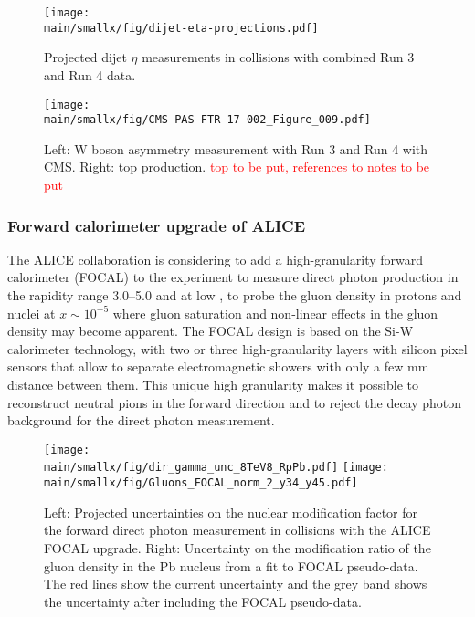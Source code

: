 \documentclass[../report.tex]{subfiles}
\providecommand{\main}{..}
\begin{document}
\begin{figure} %
\centering
\texttt{[image: \\main/smallx/fig/dijet-eta-projections.pdf]}
\caption{
Projected dijet $\eta$ measurements in \pPb collisions with combined Run 3 and Run 4 data.
\label{fig:dijet-eta-projection-cms}
}
\end{figure}

\begin{figure}
    \texttt{[image: \\main/smallx/fig/CMS-PAS-FTR-17-002\_Figure\_009.pdf]}
    \caption{Left: W boson asymmetry measurement with Run 3 and Run 4 with CMS. Right: top production. \textcolor{red}{top to be put, references to notes to be put}
    \label{fig:CMShighpt}
    }
\end{figure}

\clearpage
\newpage

\subsubsection{Forward calorimeter upgrade of ALICE}
\label{sec:Focal}
The ALICE collaboration is considering to add a high-granularity forward calorimeter (FOCAL) to the experiment to  measure direct photon production in the rapidity range 3.0--5.0 and at low \pT, to probe the gluon density in protons and nuclei at $x\sim 10^{-5}$ where gluon saturation and non-linear effects in the gluon density may become apparent. The FOCAL design is based on the Si-W calorimeter technology, with two or three high-granularity layers with silicon pixel sensors that allow to separate electromagnetic showers with only a few mm distance between them. This unique high granularity makes it possible to reconstruct neutral pions in the forward direction and to reject the decay photon background for the direct photon measurement.

\begin{figure}
\texttt{[image: \\main/smallx/fig/dir\_gamma\_unc\_8TeV8\_RpPb.pdf]}
\texttt{[image: \\main/smallx/fig/Gluons\_FOCAL\_norm\_2\_y34\_y45.pdf]}
\caption{\label{fig:focal}Left: Projected uncertainties on the nuclear modification factor for the forward direct photon measurement in \pPb collisions with the ALICE FOCAL upgrade. Right: Uncertainty on the modification ratio of the gluon density in the Pb nucleus from a fit to FOCAL pseudo-data. The red lines show the current uncertainty and the grey band shows the uncertainty after including the FOCAL pseudo-data.}
\end{figure}
\end{document}
